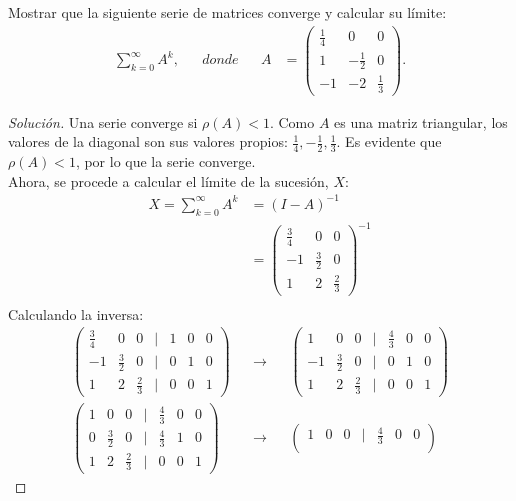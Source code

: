 \documentclass[12pt]{book}
\newenvironment{solucion}
  {\renewcommand\qedsymbol{$\square$}\begin{proof}[Solución]}
  {\end{proof}}
\begin{document}
\eje Mostrar que la siguiente serie de matrices converge y calcular su límite:
\begin{align*}
    \sum_{k=0}^\infty A^k,& & donde & & A&=\begin{pmatrix}
    \frac{1}{4} & 0 & 0\\
    1 & -\frac{1}{2} & 0\\
    -1 & -2 & \frac{1}{3}
    \end{pmatrix}.
\end{align*}
\begin{solucion}
Una serie converge si $\rho(A)<1$. Como $A$ es una matriz triangular, los valores de la diagonal son sus valores propios: $\frac{1}{4},-\frac{1}{2},\frac{1}{3}$. Es evidente que $\rho(A)<1$, por lo que la serie converge.\\
Ahora, se procede a calcular el límite de la sucesión, $X$:
\begin{align*}
    X=\sum_{k=0}^\infty A^k &=(I-A)^{-1}\\
    &=\begin{pmatrix}
    \frac{3}{4} & 0 & 0\\
    -1 & \frac{3}{2} & 0\\
    1 & 2 & \frac{2}{3}
    \end{pmatrix}^{-1}\\
\end{align*}
Calculando la inversa:
\begin{align*}
    \begin{pmatrix}
    \frac{3}{4} & 0 & 0 & | & 1 & 0 & 0\\
    -1 & \frac{3}{2} & 0 & | & 0 & 1 & 0\\
    1 & 2 & \frac{2}{3} & | & 0 & 0 & 1
    \end{pmatrix}& & \rightarrow & & \begin{pmatrix}
    1 & 0 & 0 & | & \frac{4}{3} & 0 & 0\\
    -1 & \frac{3}{2} & 0 & | & 0 & 1 & 0\\
    1 & 2 & \frac{2}{3} & | & 0 & 0 & 1
    \end{pmatrix}\\[8pt]
    \begin{pmatrix}
    1 & 0 & 0 & | & \frac{4}{3} & 0 & 0\\
    0 & \frac{3}{2} & 0 & | & \frac{4}{3} & 1 & 0\\
    1 & 2 & \frac{2}{3} & | & 0 & 0 & 1
    \end{pmatrix} & &\rightarrow & & \begin{pmatrix}
    1 & 0 & 0 & | & \frac{4}{3} & 0 & 0\\

\end{pmatrix}
\end{align*}
\end{solucion}
\end{document}

